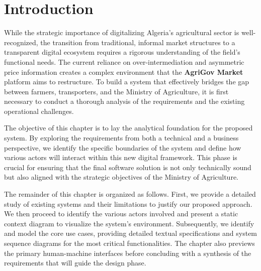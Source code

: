 \section{Introduction}

While the strategic importance of digitalizing Algeria's agricultural sector is well-recognized, the transition from traditional, informal market structures to a transparent digital ecosystem requires a rigorous understanding of the field's functional needs. The current reliance on over-intermediation and asymmetric price information \cite{CIHEAM2025} creates a complex environment that the \textbf{AgriGov Market} platform aims to restructure. To build a system that effectively bridges the gap between farmers, transporters, and the Ministry of Agriculture, it is first necessary to conduct a thorough analysis of the requirements and the existing operational challenges.

The objective of this chapter is to lay the analytical foundation for the proposed system. By exploring the requirements from both a technical and a business perspective, we identify the specific boundaries of the system and define how various actors will interact within this new digital framework. This phase is crucial for ensuring that the final software solution is not only technically sound but also aligned with the strategic objectives of the Ministry of Agriculture.

The remainder of this chapter is organized as follows. First, we provide a detailed study of existing systems and their limitations to justify our proposed approach. We then proceed to identify the various actors involved and present a static context diagram to visualize the system's environment. Subsequently, we identify and model the core use cases, providing detailed textual specifications and system sequence diagrams for the most critical functionalities. The chapter also previews the primary human-machine interfaces before concluding with a synthesis of the requirements that will guide the design phase.